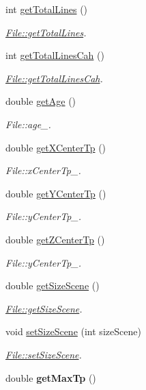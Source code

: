 \begin{DoxyCompactItemize}
\item 
int \hyperlink{classFile_ad1024f9c4c3c48083f024aefaf45b9b8}{get\+Total\+Lines} ()
\begin{DoxyCompactList}\small\item\em \hyperlink{classFile_ad1024f9c4c3c48083f024aefaf45b9b8}{File\+::get\+Total\+Lines}. \end{DoxyCompactList}\item 
int \hyperlink{classFile_ab18dbfe80270e02ebb5e11754c30baa2}{get\+Total\+Lines\+Cah} ()
\begin{DoxyCompactList}\small\item\em \hyperlink{classFile_ab18dbfe80270e02ebb5e11754c30baa2}{File\+::get\+Total\+Lines\+Cah}. \end{DoxyCompactList}\item 
double \hyperlink{classFile_a3869cf9e61963974d68005449e47b0a5}{get\+Age} ()
\begin{DoxyCompactList}\small\item\em File\+::age\+\_\+. \end{DoxyCompactList}\item 
double \hyperlink{classFile_a9e40fb995d13f0ed06ef1d56508eb8ed}{get\+X\+Center\+Tp} ()
\begin{DoxyCompactList}\small\item\em File\+::x\+Center\+Tp\+\_\+. \end{DoxyCompactList}\item 
double \hyperlink{classFile_a1f9f5945b6d122bd4fbed4ea02596e8c}{get\+Y\+Center\+Tp} ()
\begin{DoxyCompactList}\small\item\em File\+::y\+Center\+Tp\+\_\+. \end{DoxyCompactList}\item 
double \hyperlink{classFile_a66dad0937bbef79d22bfca7428e9c5b8}{get\+Z\+Center\+Tp} ()
\begin{DoxyCompactList}\small\item\em File\+::y\+Center\+Tp\+\_\+. \end{DoxyCompactList}\item 
double \hyperlink{classFile_ab59ff015aacc745232543dfde488a98e}{get\+Size\+Scene} ()
\begin{DoxyCompactList}\small\item\em \hyperlink{classFile_ab59ff015aacc745232543dfde488a98e}{File\+::get\+Size\+Scene}. \end{DoxyCompactList}\item 
void \hyperlink{classFile_a4843f3a7a5bfaa86d11dbbf0adac7f0d}{set\+Size\+Scene} (int size\+Scene)
\begin{DoxyCompactList}\small\item\em \hyperlink{classFile_a4843f3a7a5bfaa86d11dbbf0adac7f0d}{File\+::set\+Size\+Scene}. \end{DoxyCompactList}\item 
\hypertarget{classFile_a6ff77386e6bb7c109ae83f2b00d1b75d}{}double {\bfseries get\+Max\+Tp} ()\label{classFile_a6ff77386e6bb7c109ae83f2b00d1b75d}


\end{DoxyCompactItemize}
